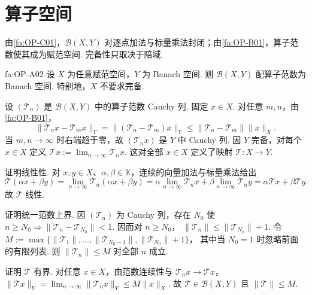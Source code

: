 \section{算子空间}\label{sec:i05-operator-space}

由\autoref{fa:OP-C01}，\(\displaystyle \mathcal B(X,Y)\) 对逐点加法与标量乘法封闭；由\autoref{fa:OP-B01}，算子范数使其成为赋范空间. 完备性只取决于陪域.

\begin{FATheorem}[A][有界算子空间完备性]{fa:OP-A02}
设 \(\displaystyle X\) 为任意赋范空间，\(\displaystyle Y\) 为 Banach 空间. 则 \(\displaystyle \mathcal B(X,Y)\) 配算子范数为 Banach 空间. 特别地，\(\displaystyle X\) 不要求完备.
\end{FATheorem}

\begin{FAProof}
设 \(\displaystyle (\mathcal T_n)\) 是 \(\displaystyle \mathcal B(X,Y)\) 中的算子范数 Cauchy 列. 固定 \(\displaystyle x\in X\). 对任意 \(\displaystyle m,n\)，由\autoref{fa:OP-B01}，
\[
\|\mathcal T_nx-\mathcal T_mx\|_Y
=\|(\mathcal T_n-\mathcal T_m)x\|_Y
\leqslant\|\mathcal T_n-\mathcal T_m\|\|x\|_X.
\]
当 \(\displaystyle m,n\to\infty\) 时右端趋于零，故 \(\displaystyle (\mathcal T_nx)\) 是 \(\displaystyle Y\) 中 Cauchy 列. 因 \(\displaystyle Y\) 完备，对每个 \(\displaystyle x\in X\) 定义 \(\displaystyle \mathcal T x:=\lim_{n\to\infty}\mathcal T_nx\).
这对全部 \(\displaystyle x\in X\) 定义了映射 \(\displaystyle \mathcal T:X\to Y\).

证明线性性. 对 \(\displaystyle x,y\in X\)、\(\displaystyle \alpha,\beta\in\mathbb K\)，连续的向量加法与标量乘法给出
\[
\mathcal T(\alpha x+\beta y)
=\lim_{n\to\infty}\mathcal T_n(\alpha x+\beta y)
=\alpha\lim_{n\to\infty}\mathcal T_nx+\beta\lim_{n\to\infty}\mathcal T_ny
=\alpha\mathcal T x+\beta\mathcal T y.
\]
故 \(\displaystyle \mathcal T\) 线性.

证明统一范数上界. 因 \(\displaystyle (\mathcal T_n)\) 为 Cauchy 列，存在 \(\displaystyle N_0\) 使 \(\displaystyle n\geqslant N_0\Rightarrow\|\mathcal T_n-\mathcal T_{N_0}\|<1\). 因而对 \(\displaystyle n\geqslant N_0\)， \(\displaystyle \|\mathcal T_n\| \leqslant\|\mathcal T_{N_0}\|+1\).
令 \(\displaystyle M:=\max\{\|\mathcal T_1\|,\dots,\|\mathcal T_{N_0-1}\|,\|\mathcal T_{N_0}\|+1\}\)，
其中当 \(\displaystyle N_0=1\) 时忽略前面的有限列表. 则 \(\displaystyle \|\mathcal T_n\|\leqslant M\) 对全部 \(\displaystyle n\) 成立.

证明 \(\displaystyle \mathcal T\) 有界. 对任意 \(\displaystyle x\in X\)，由范数连续性与 \(\displaystyle \mathcal T_nx\to\mathcal T x\)， \(\displaystyle \|\mathcal T x\|_Y =\lim_{n\to\infty}\|\mathcal T_nx\|_Y \leqslant M\|x\|_X\).
故 \(\displaystyle \mathcal T\in\mathcal B(X,Y)\) 且 \(\displaystyle \|\mathcal T\|\leqslant M\).


\end{FAProof}
